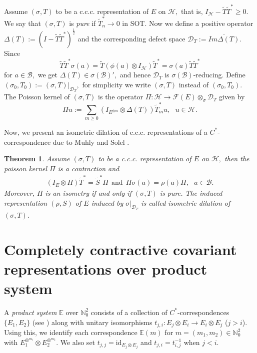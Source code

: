 \documentclass[12pt]{amsart}
\numberwithin{equation}{section}
\theoremstyle{plain}
\newtheorem{theorem}{Theorem}[section]
\newcommand{\be}{\mathbb E}
\newcommand{\ot}{\otimes}
\newcommand {\id} {{\textrm{id}}}
\newcommand{\wt}{\widetilde}
\newcommand{\wT}{\wt{T}}
\begin{document}
Assume $(\sigma, T)$ to be a c.c.c. representation of $E$ on  $\mathcal{H},$ that is, $I_{\mathcal{H}}-\wT\wT^*\ge 0.$ We say that $(\sigma, T)$ is {\it pure} if $\wT_n^*\to 0$ in SOT. Now we define a positive operator $\Delta(T):=(I-\widetilde{T}{\widetilde{T}}^*)^{\frac{1}{2}}$ and the corresponding defect space $\mathcal{D}_{T}:=\overline{Im\Delta(T)}$. Since $$\wT\wT^*\sigma(a)=\wT(\phi(a)\ot I_{\mathcal{H}})\wT^*=\sigma(a)\wT\wT^*$$ for $a\in \mathcal{B},$ we get  $\Delta(T) \in \sigma(\mathcal{B})',$ and hence $\mathcal{D}_{T}$ is $\sigma(\mathcal{B})$-reducing. Define $(\sigma_0, T_0):=(\sigma ,T)|_{\mathcal{D}_{T}},$ for simplicity we write $(\sigma, T)$ instead of $(\sigma_0, T_0)$. The Poisson kernel of $(\sigma, T)$ \cite{MS98} is the operator $\Pi: \mathcal{H} \longrightarrow \mathcal{F}(E)\otimes_{\sigma}\mathcal{D}_{T}$ given by $$\Pi u:=\sum_{m\geq0}(I_{E^{\otimes m}}\otimes\Delta(T))\widetilde{T}_m^* u,\:\:\: u \in \mathcal{H}.$$

Now, we present an isometric dilation of c.c.c. representations of a $C^*$-correspondence due to Muhly and Solel \cite{MS98}. 	
\begin{theorem}\label{dilation}
		Assume $(\sigma, T)$ to be a c.c.c. representation of $E$ on $\mathcal{H},$ then the poisson kernel $\Pi$ is a contraction and
		\begin{align} \label{sid}
		  (I_{E} \ot \Pi)\widetilde{T}^{*}=\widetilde{S}^{*}\Pi  \:\: \mbox{and} \:\:  	\Pi \sigma(a)=\rho(a)\Pi, \:\:\:a \in \mathcal{B}. 
		\end{align}
		Moreover, $\Pi$ is an isometry if and only if $(\sigma, T) $ is pure. The induced representation $(\rho,S)$ of $E$ induced by $\sigma|_{\mathcal{D}_{T}}$ is called {\rm isometric dilation} of $(\sigma, T).$
\end{theorem}
	

	

	
	\section{Completely contractive covariant representations over product system}
	
	
	 A \emph{product system} $\be$ over $\mathbb{N}^2_0$ consists of a collection of $C^*$-correspondences $\{E_1,E_2\}$ (see \cite{F02, SZ08, S06, S08}) along with unitary isomorphisms $t_{j,i}: E_j \ot E_i \to E_i \ot E_j$ ($j>i$). Using this, we identify each correspondence $\be (m)$ for $m=(m_1,m_2) \in \mathbb N^2_0$ with $E_1^{\ot^{ m_1}}\ot E_2^{\ot^{m_2}}.$ We also set $t_{j,j} = \id_{E_j \ot E_j}$ and $t_{j,i} = t_{i,j}^{-1}$ when \(j < i\).
	
\end{document}
